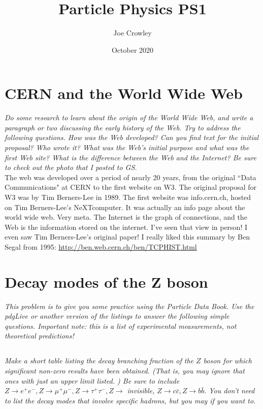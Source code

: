 \documentclass[12pt, letterpaper]{article}
\title{Particle Physics PS1}
\author{Joe Crowley}
\date{October 2020}
\begin{document}
  

\section{CERN and the World Wide Web}
\textit{Do some research to learn about the origin of the World Wide Web, and write a paragraph or two discussing the early history of the Web. Try to address the following questions. How was the Web developed? Can you find text for the initial proposal? Who wrote it? What was the Web's initial purpose and what was the first Web site? What is the difference between the Web and the Internet? Be sure to check out the photo that I posted to GS.}\\

The web was developed over a period of nearly 20 years, from the original ``Data Communications" at CERN to the first website on W3. The original proposal for W3 was by Tim Berners-Lee in 1989. The first website was info.cern.ch, hosted on Tim Berners-Lee's NeXTcomputer. It was actually an info page about the world wide web. Very meta. The Internet is the graph of connections, and the Web is the information stored on the internet. I've seen that view in person! I even saw Tim Berners-Lee's original paper! I really liked this summary by Ben Segal from 1995: \href{http://ben.web.cern.ch/ben/TCPHIST.html}{http://ben.web.cern.ch/ben/TCPHIST.html}

\section{Decay modes of the Z boson}
\textit{This problem is to give you some practice using the Particle Data Book. Use the pdgLive or another version of the listings to answer the following simple questions. Important note: this is a list of experimental measurements, not theoretical predictions!}

\subsection{}
\textit{Make a short table listing the decay branching fraction of the $Z$ boson for which significant non-zero results have been obtained. (That is, you may ignore that ones with just an upper limit listed. ) Be sure to include $Z \rightarrow e^{+} e^{-}, Z \rightarrow \mu^{+} \mu^{-}, Z \rightarrow \tau^{+} \tau^{-}, Z \rightarrow$ invisible, $Z \rightarrow c \bar{c}, Z \rightarrow b \bar{b} .$ You
don't need to list the decay modes that involve specific hadrons, but you may if you want to.}\\
\end{document}
